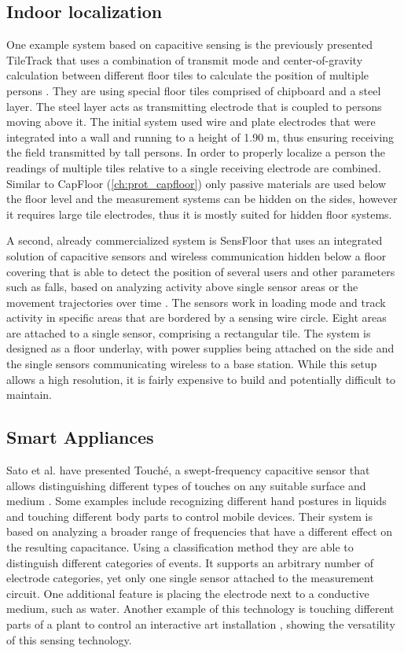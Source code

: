 \subsection{Indoor localization}
One example system based on capacitive sensing is the previously presented TileTrack that uses a combination of transmit mode and center-of-gravity calculation between different floor tiles to calculate the position of multiple persons \cite{Valtonen2009a}. They are using special floor tiles comprised of chipboard and a steel layer. The steel layer acts as transmitting electrode that is coupled to persons moving above it. The initial system used wire and plate electrodes that were integrated into a wall and running to a height of 1.90 m, thus ensuring receiving the field transmitted by tall persons. In order to properly localize a person the readings of multiple tiles relative to a single receiving electrode are combined. Similar to CapFloor (\ref{ch:prot_capfloor}) only passive materials are used below the floor level and the measurement systems can be hidden on the sides, however it requires large tile electrodes, thus it is mostly suited for hidden floor systems.

A second, already commercialized system is SensFloor that uses an integrated solution of capacitive sensors and wireless communication hidden below a floor covering that is able to detect the position of several users and other parameters such as falls, based on analyzing activity above single sensor areas or the movement trajectories over time \cite{lauterbach2009}. The sensors work in loading mode and track activity in specific areas that are bordered by a sensing wire circle. Eight areas are attached to a single sensor, comprising a rectangular tile. The system is designed as a floor underlay, with power supplies being attached on the side and the single sensors communicating wireless to a base station. While this setup allows a high resolution, it is fairly expensive to build and potentially difficult to maintain. 

\subsection{Smart Appliances}
Sato et al. have presented Touché, a swept-frequency capacitive sensor that allows distinguishing different types of touches on any suitable surface and medium \cite{Sato2012}. Some examples include recognizing different hand postures in liquids and touching different body parts to control mobile devices. Their system is based on analyzing a broader range of frequencies that have a different effect on the resulting capacitance. Using a classification method they are able to distinguish different categories of events. It supports an arbitrary number of electrode categories, yet only one single sensor attached to the measurement circuit. One additional feature is placing the electrode next to a conductive medium, such as water. Another example of this technology is touching different parts of a plant to control an interactive art installation  \cite{poupyrev2012botanicus}, showing the versatility of this sensing technology.

